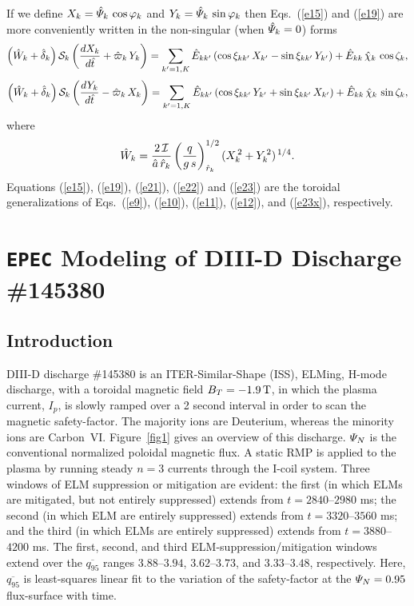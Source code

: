 \documentclass[12pt,prb,aps]{revtex4-1}
\begin{document}
If we define $X_k = \hat{\mit\Psi}_k\,\cos\varphi_k$ and $Y_k=\hat{\mit\Psi}_k\,\sin\varphi_k$ then Eqs.~(\ref{e15}) and (\ref{e19}) are
more conveniently written in the non-singular (when $\hat{\mit\Psi}_k=0$) forms
\begin{align}\label{e21}
\left(\hat{W}_k +\hat{\delta}_k\right){\cal S}_k\left(\frac{dX_k}{d\hat{t}} 
+\hat{\varpi}_k\,Y_k\right)= \sum_{k'=1,K}\hat{E}_{kk'}\,(\cos\xi_{kk'}\,X_{k'}  -\sin\xi_{kk'}\,Y_{k'}) + \hat{E}_{kk}\,\hat{\chi}_k\,\cos\zeta_k,\\[0.5ex]
\left(\hat{W}_k +\hat{\delta}_k\right){\cal S}_k\left(\frac{dY_k}{d\hat{t}} -\hat{\varpi}_k\,X_k\right)
= \sum_{k'=1,K}\hat{E}_{kk'}\,(\cos\xi_{kk'}\,Y_{k'}
+\sin\xi_{kk'}\,X_{k'}) + \hat{E}_{kk}\,\hat{\chi}_k\,\sin\zeta_k,\label{e22}
\end{align}
where
\begin{equation}\label{e23}
\hat{W}_k =\frac{2\,{\cal I}}{\hat{a}\,\hat{r}_k}\left(\frac{q}{g\,s}\right)^{1/2}_{\hat{r}_k} (X_k^{\,2} + Y_k^{\,2})^{\,1/4}.
\end{equation}
Equations (\ref{e15}), (\ref{e19}), (\ref{e21}), (\ref{e22}) and (\ref{e23}) are the toroidal generalizations of Eqs.~(\ref{e9}), (\ref{e10}), (\ref{e11}), (\ref{e12}), and (\ref{e23x}), respectively.

\section{{\tt EPEC} Modeling of DIII-D Discharge \#145380}\label{s4}
\subsection{Introduction}
DIII-D discharge \#145380 is an ITER-Similar-Shape (ISS), ELMing, H-mode discharge, with a toroidal magnetic field $B_T=-1.9\,{\rm T}$, in which the
plasma current, $I_p$, is slowly ramped over a 2 second interval in order to scan the magnetic safety-factor.\cite{d3d,d3d2} The majority ions are Deuterium, whereas the
minority ions are Carbon~VI.
Figure~\ref{fig1} gives an overview of this discharge. ${\mit\Psi}_N$ is the conventional normalized poloidal magnetic flux.
A static RMP is applied to the plasma by running steady $n=3$ currents through the I-coil system.\cite{icoil}
Three windows of ELM suppression or mitigation are evident: the first (in which ELMs are mitigated, but not
entirely suppressed) extends from $t=2840$--$2980$ ms; the
second (in which ELM are entirely suppressed) extends from $t=3320$--$3560$ ms; and the third (in which ELMs are
entirely suppressed) extends from $t=3880$--$4200$ ms. The 
first, second, and third ELM-suppression/mitigation windows extend over the $\overline{q_{95}}$ ranges $3.88$--$3.94$, $3.62$--$3.73$,
and $3.33$--$3.48$, respectively. Here, $\overline{q_{95}}$ is least-squares linear fit to the variation of the safety-factor at the ${\mit\Psi}_N = 0.95$ flux-surface with time. 
\end{document}
